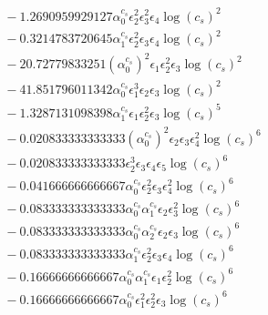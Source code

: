 \documentclass[10pt]{article}
\begin{document}
\begin{align*}
&{}  - 1.2690959929127 \alpha_{0}^{c_s} \epsilon_{2}^{2} \epsilon_{3}^{2} \epsilon_{4} \log{\left(c_{s} \right)}^{2} \\
&{}  - 0.3214783720645 \alpha_{1}^{c_s} \epsilon_{2}^{2} \epsilon_{3} \epsilon_{4} \log{\left(c_{s} \right)}^{2} \\
&{}  - 20.72779833251 \left(\alpha_{0}^{c_s}\right)^{2} \epsilon_{1} \epsilon_{2}^{2} \epsilon_{3} \log{\left(c_{s} \right)}^{2} \\
&{}  - 41.851796011342 \alpha_{0}^{c_s} \epsilon_{1}^{3} \epsilon_{2} \epsilon_{3} \log{\left(c_{s} \right)}^{2} \\
&{}  - 1.3287131098398 \alpha_{1}^{c_s} \epsilon_{1} \epsilon_{2}^{2} \epsilon_{3} \log{\left(c_{s} \right)}^{5} \\
&{}  - 0.020833333333333 \left(\alpha_{0}^{c_s}\right)^{2} \epsilon_{2} \epsilon_{3} \epsilon_{4}^{2} \log{\left(c_{s} \right)}^{6} \\
&{}  - 0.020833333333333 \epsilon_{2}^{3} \epsilon_{3} \epsilon_{4} \epsilon_{5} \log{\left(c_{s} \right)}^{6} \\
&{}  - 0.041666666666667 \alpha_{0}^{c_s} \epsilon_{2}^{2} \epsilon_{3} \epsilon_{4}^{2} \log{\left(c_{s} \right)}^{6} \\
&{}  - 0.083333333333333 \alpha_{0}^{c_s} \alpha_{1}^{c_s} \epsilon_{2} \epsilon_{3}^{2} \log{\left(c_{s} \right)}^{6} \\
&{}  - 0.083333333333333 \alpha_{0}^{c_s} \alpha_{2}^{c_s} \epsilon_{2} \epsilon_{3} \log{\left(c_{s} \right)}^{6} \\
&{}  - 0.083333333333333 \alpha_{1}^{c_s} \epsilon_{2}^{2} \epsilon_{3} \epsilon_{4} \log{\left(c_{s} \right)}^{6} \\
&{}  - 0.16666666666667 \alpha_{0}^{c_s} \alpha_{1}^{c_s} \epsilon_{1} \epsilon_{2}^{2} \log{\left(c_{s} \right)}^{6} \\
&{}  - 0.16666666666667 \alpha_{0}^{c_s} \epsilon_{1}^{2} \epsilon_{2}^{2} \epsilon_{3} \log{\left(c_{s} \right)}^{6}
\end{align*}
\end{document}
